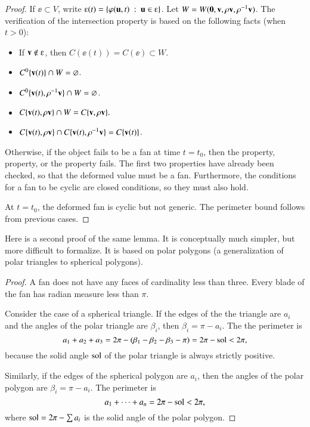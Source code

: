 \begin{proof}
  If $\ee\subset V$, write $\ee(t) = \{\varphi(\u,t) \mid \u\in \ee\}$.   Let $W =W({\mathbf 0},{\mathbf v},\rho{\mathbf v},\rho^{-1}{\mathbf v})$. The verification of the intersection property is based on the following facts (when $t>0$):
\begin{itemize} 
\item If $\v\not\in \ee$, then $C(\ee(t))=C(\ee)\subset W$.
\item $C^0\{{\mathbf v}(t)\} \cap W = \varnothing$.
\item $C^0\{{\mathbf v}(t),\rho^{-1}{\mathbf v}\}\cap W = \varnothing$.
\item $C\{{\mathbf v}(t),\rho{\mathbf v}\}\cap W = C\{{\mathbf v},\rho{\mathbf v}\}.$
\item $C\{{\mathbf v}(t),\rho{\mathbf v}\}\cap C\{{\mathbf v}(t),\rho^{-1}{\mathbf v}\} = C\{{\mathbf v}(t)\}$.
\end{itemize}

Otherwise, if the object fails to be a fan at time $t=t_0$, then the  property,   property, or the  property fails.  
The first two properties have already been checked, so that the deformed value must be a fan.  Furthermore, the conditions for a fan to be cyclic are closed conditions, so they must also hold. 

At $t=t_0$, the deformed fan is cyclic but not generic.   The perimeter bound follows  from previous cases.
\end{proof}

Here is a second proof of the same lemma.  It is conceptually much simpler, but more difficult to formalize.  It is based on polar polygons (a generalization of polar triangles to spherical polygons).

\begin{proof} A fan does not have any faces of cardinality less than three.
Every blade of the fan has radian measure less than $\pi$.  
%

Consider the case of a spherical triangle.  If the edges of the
the triangle are $a_i$ and the angles of the polar
triangle are $\beta_i$, then $\beta_i=\pi-a_i$.
The the perimeter is 
$$a_1+a_2+a_3 = 2\pi - (\beta_1 -\beta_2 - \beta_3-\pi)= 2\pi-{\operatorname{sol}} < 2\pi,$$
because the solid angle ${\operatorname{sol}}$ of the polar triangle is always strictly positive.
%

Similarly, if the edges of the spherical polygon are
$a_i$, then the angles of the polar polygon are $\beta_i = \pi-a_i$.
The perimeter is
$$
a_1+\cdots+a_n  = 2\pi- {\operatorname{sol}}< 2\pi,
$$
where ${\operatorname{sol}} = 2\pi-\sum a_i$ is the solid angle of the polar polygon.
%
\end{proof}


